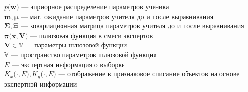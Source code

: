 $p\bigr(\mathbf{w}\bigr)$ --- априорное распределение параметров ученика\\
$\mathbf{m}, \bm{\mu}$ --- мат. ожидание параметров учителя до и после выравнивания\\
$\bm{\Sigma}, \bm{\Xi}$ --- ковариационная матрица параметров учителя до и после выравнивания\\
$\bm{\pi}\bigr(\mathbf{x}, \mathbf{V}\bigr)$ --- шлюзовая функция в смеси экспертов\\
$\mathbf{V} \in \mathbb{V}$ --- параметры шлюзовой функции\\
$\mathbb{V}$ --- пространство параметров шлюзовой функции\\
$E$ --- экспертная информация о выборке\\
$K_{x}\bigr(\cdot, E\bigr), K_{y}\bigr(\cdot, E\bigr)$ --- отображение в признаковое описание объектов на основе экспертной информации\\